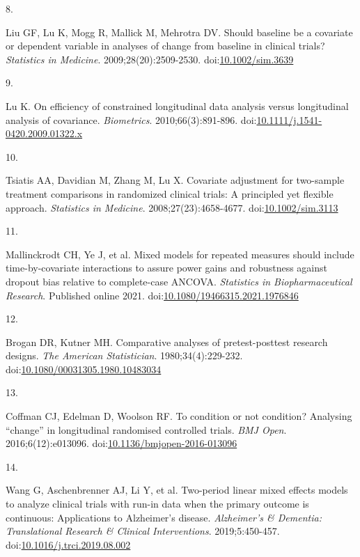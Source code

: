 \documentclass[
  11pt,
]{article}
\newlength{\cslhangindent}
\newlength{\csllabelwidth}
\newenvironment{CSLReferences}[2] %
 {\begin{list}{}{%
  \setlength{\itemindent}{0pt}
  \setlength{\leftmargin}{0pt}
  \setlength{\parsep}{0pt}
  \ifodd #1
   \setlength{\leftmargin}{\cslhangindent}
   \setlength{\itemindent}{-1\cslhangindent}
  \fi
  \setlength{\itemsep}{#2\baselineskip}}}
 {\end{list}}
\newcommand{\CSLLeftMargin}[1]{\parbox[t]{\csllabelwidth}{\strut#1\strut}}
\newcommand{\CSLRightInline}[1]{\parbox[t]{\linewidth - \csllabelwidth}{\strut#1\strut}}
\begin{document}
\begin{CSLReferences}{0}{1}
\CSLLeftMargin{8. }%
\CSLRightInline{Liu GF, Lu K, Mogg R, Mallick M, Mehrotra DV. Should baseline be a covariate or dependent variable in analyses of change from baseline in clinical trials? \emph{Statistics in Medicine}. 2009;28(20):2509-2530. doi:\href{https://doi.org/10.1002/sim.3639}{10.1002/sim.3639}}

\CSLLeftMargin{9. }%
\CSLRightInline{Lu K. On efficiency of constrained longitudinal data analysis versus longitudinal analysis of covariance. \emph{Biometrics}. 2010;66(3):891-896. doi:\href{https://doi.org/10.1111/j.1541-0420.2009.01322.x}{10.1111/j.1541-0420.2009.01322.x}}

\CSLLeftMargin{10. }%
\CSLRightInline{Tsiatis AA, Davidian M, Zhang M, Lu X. Covariate adjustment for two-sample treatment comparisons in randomized clinical trials: A principled yet flexible approach. \emph{Statistics in Medicine}. 2008;27(23):4658-4677. doi:\href{https://doi.org/10.1002/sim.3113}{10.1002/sim.3113}}

\CSLLeftMargin{11. }%
\CSLRightInline{{Mallinckrodt CH, Ye J, et al.} Mixed models for repeated measures should include time-by-covariate interactions to assure power gains and robustness against dropout bias relative to complete-case {ANCOVA}. \emph{Statistics in Biopharmaceutical Research}. Published online 2021. doi:\href{https://doi.org/10.1080/19466315.2021.1976846}{10.1080/19466315.2021.1976846}}

\CSLLeftMargin{12. }%
\CSLRightInline{Brogan DR, Kutner MH. Comparative analyses of pretest-posttest research designs. \emph{The American Statistician}. 1980;34(4):229-232. doi:\href{https://doi.org/10.1080/00031305.1980.10483034}{10.1080/00031305.1980.10483034}}

\CSLLeftMargin{13. }%
\CSLRightInline{Coffman CJ, Edelman D, Woolson RF. To condition or not condition? {Analysing} {``change''} in longitudinal randomised controlled trials. \emph{BMJ Open}. 2016;6(12):e013096. doi:\href{https://doi.org/10.1136/bmjopen-2016-013096}{10.1136/bmjopen-2016-013096}}

\CSLLeftMargin{14. }%
\CSLRightInline{Wang G, Aschenbrenner AJ, Li Y, et al. Two-period linear mixed effects models to analyze clinical trials with run-in data when the primary outcome is continuous: {Applications} to {Alzheimer's} disease. \emph{Alzheimer's \& Dementia: Translational Research \& Clinical Interventions}. 2019;5:450-457. doi:\href{https://doi.org/10.1016/j.trci.2019.08.002}{10.1016/j.trci.2019.08.002}}


\end{CSLReferences}
\end{document}
